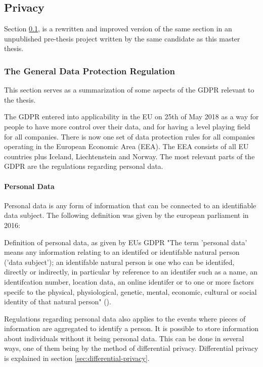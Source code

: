 \subsection{Privacy}
\label{sec:lit-privacy}
Section \ref{sec:lit-privacy}, is a rewritten and improved version of the same section in an unpublished pre-thesis project written by the same candidate as this master thesis.

\subsubsection{The General Data Protection Regulation}
\label{sec:GDPR}
This section serves as a summarization of some aspects of the GDPR relevant to the thesis.

The GDPR entered into applicability in the EU on 25th of May 2018 as a way for people to have more control over their data, and for having a level playing field for all companies. There is now one set of data protection rules for all companies operating in the European Economic Area (EEA). The EEA consists of all EU countries plus Iceland, Liechtenstein and Norway. The most relevant parts of the GDPR are the regulations regarding personal data.

\paragraph{Personal Data}
\label{sec:personal_data}
Personal data is any form of information that can be connected to an identifiable data subject. The following definition was given by the european parliament in 2016:

\begin{myquote}{Definition of personal data, as given by EUs GDPR}
    "The term 'personal data' means any information relating to an identifed or identifable natural person ('data subject'); an identifable natural person is one who can be identifed, directly or indirectly, in particular by reference to an identifer such as a name, an identifcation number, location data, an online identifer or to one or more factors specifc to the physical, physiological, genetic, mental, economic, cultural or social identity of that natural person" (\cite{in2023gdpr_website}).
\end{myquote}

Regulations regarding personal data also applies to the events where pieces of information are aggregated to identify a person. It is possible to store information about individuals without it being personal data. This can be done in several ways, one of them being by the method of differential privacy. Differential privacy is explained in section \ref{sec:differential-privacy}.

